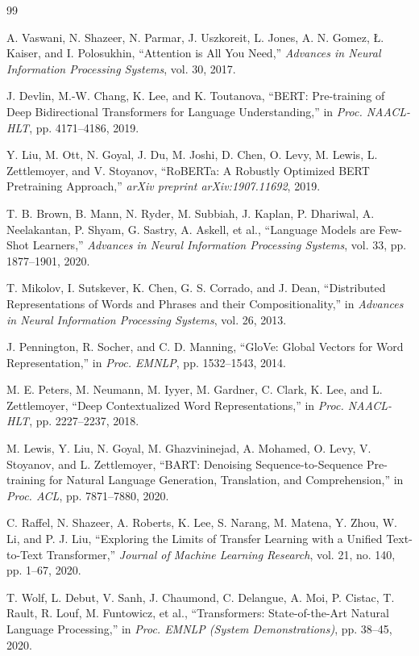 \documentclass[11pt]{article}
\begin{document}
\begin{thebibliography}{99}

A. Vaswani, N. Shazeer, N. Parmar, J. Uszkoreit, L. Jones, A. N. Gomez, \L. Kaiser, and I. Polosukhin,
``Attention is All You Need,''
\textit{Advances in Neural Information Processing Systems}, vol. 30, 2017.

J. Devlin, M.-W. Chang, K. Lee, and K. Toutanova,
``BERT: Pre-training of Deep Bidirectional Transformers for Language Understanding,''
in \textit{Proc. NAACL-HLT}, pp. 4171--4186, 2019.

Y. Liu, M. Ott, N. Goyal, J. Du, M. Joshi, D. Chen, O. Levy, M. Lewis, L. Zettlemoyer, and V. Stoyanov,
``RoBERTa: A Robustly Optimized BERT Pretraining Approach,''
\textit{arXiv preprint arXiv:1907.11692}, 2019.

T. B. Brown, B. Mann, N. Ryder, M. Subbiah, J. Kaplan, P. Dhariwal, A. Neelakantan, P. Shyam,
G. Sastry, A. Askell, et al.,
``Language Models are Few-Shot Learners,''
\textit{Advances in Neural Information Processing Systems}, vol. 33, pp. 1877--1901, 2020.

T. Mikolov, I. Sutskever, K. Chen, G. S. Corrado, and J. Dean,
``Distributed Representations of Words and Phrases and their Compositionality,''
in \textit{Advances in Neural Information Processing Systems}, vol. 26, 2013.

J. Pennington, R. Socher, and C. D. Manning,
``GloVe: Global Vectors for Word Representation,''
in \textit{Proc. EMNLP}, pp. 1532--1543, 2014.

M. E. Peters, M. Neumann, M. Iyyer, M. Gardner, C. Clark, K. Lee, and L. Zettlemoyer,
``Deep Contextualized Word Representations,''
in \textit{Proc. NAACL-HLT}, pp. 2227--2237, 2018.

M. Lewis, Y. Liu, N. Goyal, M. Ghazvininejad, A. Mohamed, O. Levy, V. Stoyanov, and L. Zettlemoyer,
``BART: Denoising Sequence-to-Sequence Pre-training for Natural Language Generation, Translation, and Comprehension,''
in \textit{Proc. ACL}, pp. 7871--7880, 2020.

C. Raffel, N. Shazeer, A. Roberts, K. Lee, S. Narang, M. Matena, Y. Zhou, W. Li, and P. J. Liu,
``Exploring the Limits of Transfer Learning with a Unified Text-to-Text Transformer,''
\textit{Journal of Machine Learning Research}, vol. 21, no. 140, pp. 1--67, 2020.

T. Wolf, L. Debut, V. Sanh, J. Chaumond, C. Delangue, A. Moi, P. Cistac, T. Rault, R. Louf,
M. Funtowicz, et al.,
``Transformers: State-of-the-Art Natural Language Processing,''
in \textit{Proc. EMNLP (System Demonstrations)}, pp. 38--45, 2020.

\end{thebibliography}
\end{document}
